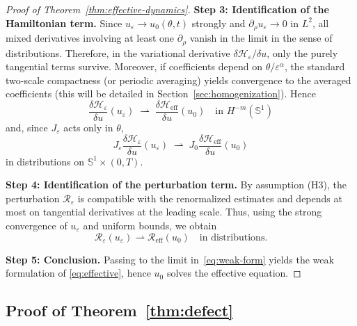 \documentclass[11pt]{amsart}
\theoremstyle{plain}
\theoremstyle{definition}
\theoremstyle{remark}
\theoremstyle{remark}
\begin{document}
\begin{proof}[Proof of Theorem~\ref{thm:effective-dynamics}]
\smallskip
\noindent\textbf{Step 3: Identification of the Hamiltonian term.}
Since \(u_\varepsilon\to u_0(\theta,t)\) strongly and \(\partial_\rho u_\varepsilon\to0\)
in \(L^2\), all mixed derivatives involving at least one \(\partial_\rho\)
vanish in the limit in the sense of distributions.
Therefore, in the variational derivative
\(\delta\mathcal H_\varepsilon/\delta u\), only the purely tangential terms
survive.
Moreover, if coefficients depend on \(\theta/\varepsilon^\alpha\), the standard
two-scale compactness (or periodic averaging) yields convergence to the averaged
coefficients (this will be detailed in Section~\ref{sec:homogenization}).
Hence
\[
\frac{\delta\mathcal H_\varepsilon}{\delta u}(u_\varepsilon)
\;\rightharpoonup\;
\frac{\delta\mathcal H_{\mathrm{eff}}}{\delta u}(u_0)
\quad\text{in }H^{-m}(\mathbb S^1)
\]
and, since \(J_\varepsilon\) acts only in \(\theta\),
\[
J_\varepsilon\frac{\delta\mathcal H_\varepsilon}{\delta u}(u_\varepsilon)
\;\rightharpoonup\;
J_0\frac{\delta\mathcal H_{\mathrm{eff}}}{\delta u}(u_0)
\]
in distributions on \(\mathbb S^1\times(0,T)\).

\smallskip
\noindent\textbf{Step 4: Identification of the perturbation term.}
By assumption (H3), the perturbation \(\mathcal R_\varepsilon\) is compatible with
the renormalized estimates and depends at most on tangential derivatives at the
leading scale.
Thus, using the strong convergence of \(u_\varepsilon\) and uniform bounds, we
obtain
\[
\mathcal R_\varepsilon(u_\varepsilon)\rightharpoonup \mathcal R_{\mathrm{eff}}(u_0)
\quad\text{in distributions}.
\]

\smallskip
\noindent\textbf{Step 5: Conclusion.}
Passing to the limit in~\eqref{eq:weak-form} yields the weak formulation of
\eqref{eq:effective}, hence \(u_0\) solves the effective equation.
\end{proof}

\subsection{Proof of Theorem~\ref{thm:defect}}
\label{subsec:proof-defect}
\end{document}
